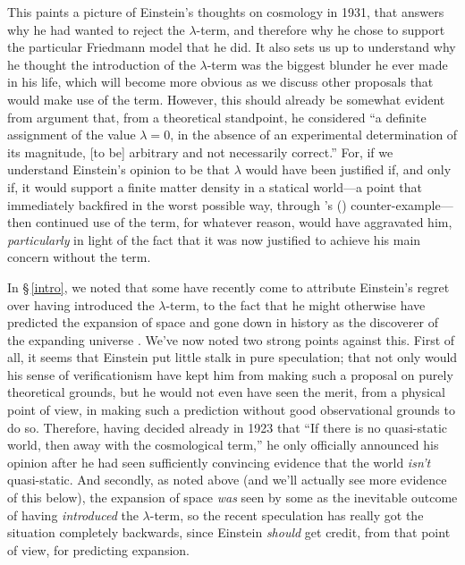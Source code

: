 \documentclass[12 pt]{article}
\def\citeapos#1{\citeauthor{#1}'s (\citeyear{#1})}
\begin{document}
This paints a picture of Einstein's thoughts on cosmology in 1931, that answers why he had wanted to reject the $\lambda$-term, and therefore why he chose to support the particular Friedmann model that he did. It also sets us up to understand why he thought the introduction of the $\lambda$-term was the biggest blunder he ever made in his life, which will become more obvious as we discuss other proposals that would make use of the term. However, this should already be somewhat evident from \citet{Tolman1931a} argument that, from a theoretical standpoint, he considered ``a definite assignment of the value $\lambda=0$, in the absence of an experimental determination of its magnitude, [to be] arbitrary and not necessarily correct.'' For, if we understand Einstein's opinion to be that $\lambda$ would have been justified if, and only if, it would support a finite matter density in a statical world---a point that immediately backfired in the worst possible way, through \citeapos{deSitter1917a} counter-example---then continued use of the term, for whatever reason, would have aggravated him, \textit{particularly} in light of the fact that it was now justified to achieve his main concern without the term.

In \S\,\ref{intro}, we noted that some have recently come to attribute Einstein's regret over having introduced the $\lambda$-term, to the fact that he might otherwise have predicted the expansion of space and gone down in history as the discoverer of the expanding universe \citep{Gribbin1986,Dainton2001,Penrose2005,Kolb2007}. We've now noted two strong points against this. First of all, it seems that Einstein put little stalk in pure speculation; that not only would his sense of verificationism have kept him from making such a proposal on purely theoretical grounds, but he would not even have seen the merit, from a physical point of view, in making such a prediction without good observational grounds to do so. Therefore, having decided already in 1923 that ``If there is no quasi-static world, then away with the cosmological term,'' he only officially announced his opinion after he had seen sufficiently convincing evidence that the world \textit{isn't} quasi-static. And secondly, as noted above (and we'll actually see more evidence of this below), the expansion of space \textit{was} seen by some as the inevitable outcome of having \textit{introduced} the $\lambda$-term, so the recent speculation has really got the situation completely backwards, since Einstein \textit{should} get credit, from that point of view, for predicting expansion.
\end{document}
